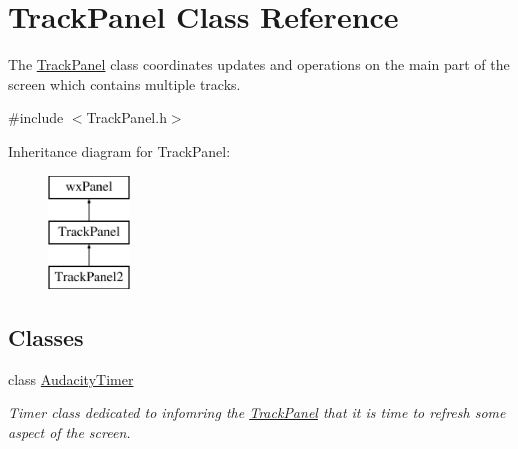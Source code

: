 \hypertarget{class_track_panel}{}\section{Track\+Panel Class Reference}
\label{class_track_panel}


The \hyperlink{class_track_panel}{Track\+Panel} class coordinates updates and operations on the main part of the screen which contains multiple tracks.  




{\ttfamily \#include $<$Track\+Panel.\+h$>$}

Inheritance diagram for Track\+Panel\+:\begin{figure}[H]
\begin{center}
\leavevmode
\includegraphics[height=3.000000cm]{class_track_panel}
\end{center}
\end{figure}
\subsection*{Classes}
\begin{DoxyCompactItemize}
\item 
class \hyperlink{class_track_panel_1_1_audacity_timer}{Audacity\+Timer}
\begin{DoxyCompactList}\small\item\em Timer class dedicated to infomring the \hyperlink{class_track_panel}{Track\+Panel} that it is time to refresh some aspect of the screen. \end{DoxyCompactList}\end{DoxyCompactItemize}
